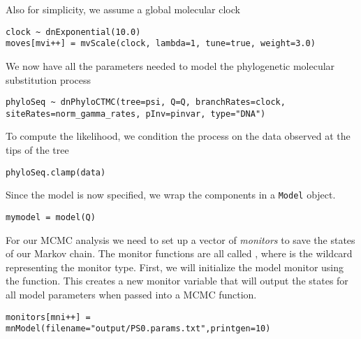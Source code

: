 Also for simplicity, we assume a global molecular clock

{\tt \small \begin{snugshade*}
\begin{lstlisting}
clock ~ dnExponential(10.0)
moves[mvi++] = mvScale(clock, lambda=1, tune=true, weight=3.0)
\end{lstlisting}
\end{snugshade*}}

We now have all the parameters needed to model the phylogenetic molecular substitution process

{\tt \begin{snugshade*}
\begin{lstlisting}
phyloSeq ~ dnPhyloCTMC(tree=psi, Q=Q, branchRates=clock, siteRates=norm_gamma_rates, pInv=pinvar, type="DNA")
\end{lstlisting}
\end{snugshade*}}

To compute the likelihood, we condition the process on the data observed at the tips of the tree

{\tt \begin{snugshade*}
\begin{lstlisting}
phyloSeq.clamp(data)
\end{lstlisting}
\end{snugshade*}}

Since the model is now specified, we wrap the components in a {\tt Model} object.

{\tt \begin{snugshade*}
\begin{lstlisting}
mymodel = model(Q)
\end{lstlisting}
\end{snugshade*}}

For our MCMC analysis we need to set up a vector of \textit{monitors} to save the states of our Markov chain. 
The monitor functions are all called , where \cl{*} is the wildcard representing the monitor type.
First, we will initialize the model monitor using the  function. This creates a new monitor variable that will output the states for all model parameters when passed into a MCMC function. 
{\tt \begin{snugshade*}
\begin{lstlisting}
monitors[mni++] = mnModel(filename="output/PS0.params.txt",printgen=10)
\end{lstlisting}
\end{snugshade*}}

